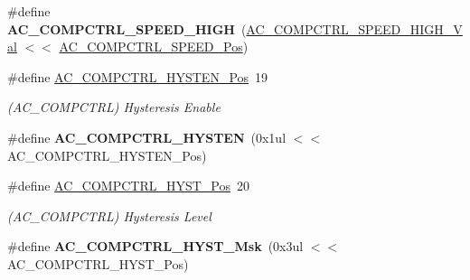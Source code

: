 \begin{DoxyCompactItemize}
\item 
\hypertarget{group___s_a_m_l21___a_c_gac5f389bdc063f45e9b15338dc17a1028}{}\#define {\bfseries A\+C\+\_\+\+C\+O\+M\+P\+C\+T\+R\+L\+\_\+\+S\+P\+E\+E\+D\+\_\+\+H\+I\+G\+H}~(\hyperlink{group___s_a_m_l21___a_c_ga6b45b0641286de29f24da3deb2330cc4}{A\+C\+\_\+\+C\+O\+M\+P\+C\+T\+R\+L\+\_\+\+S\+P\+E\+E\+D\+\_\+\+H\+I\+G\+H\+\_\+\+Val}    $<$$<$ \hyperlink{group___s_a_m_l21___a_c_gaf0d15bf42764457190c7bf06e67c0d9c}{A\+C\+\_\+\+C\+O\+M\+P\+C\+T\+R\+L\+\_\+\+S\+P\+E\+E\+D\+\_\+\+Pos})\label{group___s_a_m_l21___a_c_gac5f389bdc063f45e9b15338dc17a1028}

\item 
\hypertarget{group___s_a_m_l21___a_c_gabbef1d3d199fcbe0c3a003a4ea60515f}{}\#define \hyperlink{group___s_a_m_l21___a_c_gabbef1d3d199fcbe0c3a003a4ea60515f}{A\+C\+\_\+\+C\+O\+M\+P\+C\+T\+R\+L\+\_\+\+H\+Y\+S\+T\+E\+N\+\_\+\+Pos}~19\label{group___s_a_m_l21___a_c_gabbef1d3d199fcbe0c3a003a4ea60515f}

\begin{DoxyCompactList}\small\item\em (A\+C\+\_\+\+C\+O\+M\+P\+C\+T\+R\+L) Hysteresis Enable \end{DoxyCompactList}\item 
\hypertarget{group___s_a_m_l21___a_c_ga81d5bc8d238e768a6deaafffc6a1bfb3}{}\#define {\bfseries A\+C\+\_\+\+C\+O\+M\+P\+C\+T\+R\+L\+\_\+\+H\+Y\+S\+T\+E\+N}~(0x1ul $<$$<$ A\+C\+\_\+\+C\+O\+M\+P\+C\+T\+R\+L\+\_\+\+H\+Y\+S\+T\+E\+N\+\_\+\+Pos)\label{group___s_a_m_l21___a_c_ga81d5bc8d238e768a6deaafffc6a1bfb3}

\item 
\hypertarget{group___s_a_m_l21___a_c_ga080eedbd8cdba82fc0d24013941b523b}{}\#define \hyperlink{group___s_a_m_l21___a_c_ga080eedbd8cdba82fc0d24013941b523b}{A\+C\+\_\+\+C\+O\+M\+P\+C\+T\+R\+L\+\_\+\+H\+Y\+S\+T\+\_\+\+Pos}~20\label{group___s_a_m_l21___a_c_ga080eedbd8cdba82fc0d24013941b523b}

\begin{DoxyCompactList}\small\item\em (A\+C\+\_\+\+C\+O\+M\+P\+C\+T\+R\+L) Hysteresis Level \end{DoxyCompactList}\item 
\hypertarget{group___s_a_m_l21___a_c_ga9f4b06ff4ad483ffa4429cc624db684d}{}\#define {\bfseries A\+C\+\_\+\+C\+O\+M\+P\+C\+T\+R\+L\+\_\+\+H\+Y\+S\+T\+\_\+\+Msk}~(0x3ul $<$$<$ A\+C\+\_\+\+C\+O\+M\+P\+C\+T\+R\+L\+\_\+\+H\+Y\+S\+T\+\_\+\+Pos)\label{group___s_a_m_l21___a_c_ga9f4b06ff4ad483ffa4429cc624db684d}


\end{DoxyCompactItemize}
